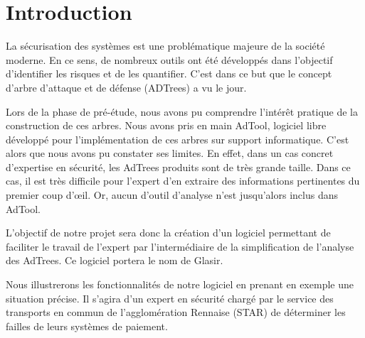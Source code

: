 \section{Introduction}
	
	La sécurisation des systèmes est une problématique majeure de la société moderne. En ce sens, de nombreux outils ont été développés dans l'objectif d'identifier les risques et de les quantifier. C'est dans ce but que le concept d'arbre d'attaque et de défense (ADTrees) a vu le jour.
	
	Lors de la phase de pré-étude, nous avons pu comprendre l’intérêt pratique de la construction de ces arbres. Nous avons pris en main AdTool, logiciel libre développé pour l'implémentation de ces arbres sur support informatique. C'est alors que nous avons pu constater ses limites. En effet, dans un cas concret d'expertise en sécurité, les AdTrees produits sont de très grande taille. Dans ce cas, il est très difficile pour l'expert d'en extraire des informations pertinentes du premier coup d’œil. Or, aucun d'outil d'analyse n'est jusqu'alors inclus dans AdTool.

	L'objectif de notre projet sera donc la création d'un logiciel permettant de faciliter le travail de l'expert par l’intermédiaire de la simplification de l'analyse des AdTrees. Ce logiciel portera le nom de Glasir.

	Nous illustrerons les fonctionnalités de notre logiciel en prenant en exemple une situation précise. Il s'agira d'un expert en sécurité chargé par le service des transports en commun de l'agglomération Rennaise (STAR) de déterminer les failles de leurs systèmes de paiement. 













